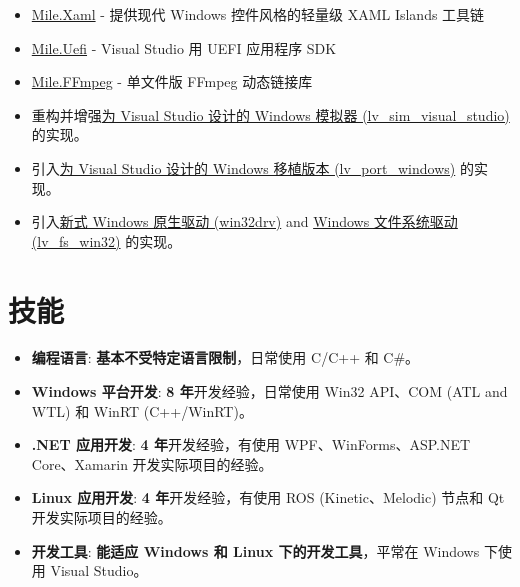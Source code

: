 \documentclass{resume}
\begin{document}
\begin{itemize}
  \item \href{https://github.com/ProjectMile/Mile.Xaml}{Mile.Xaml} - 提供现代 Windows 控件风格的轻量级 XAML Islands 工具链
  \item \href{https://github.com/ProjectMile/Mile.Uefi}{Mile.Uefi} - Visual Studio 用 UEFI 应用程序 SDK
  \item \href{https://github.com/ProjectMile/Mile.FFmpeg}{Mile.FFmpeg} - 单文件版 FFmpeg 动态链接库
\end{itemize} 

\begin{itemize}
  \item 重构并增强\href{https://github.com/lvgl/lv_sim_visual_studio}{为 Visual Studio 设计的 Windows 模拟器 (lv\_sim\_visual\_studio)} 的实现。
  \item 引入\href{https://github.com/lvgl/lv_port_windows}{为 Visual Studio 设计的 Windows 移植版本 (lv\_port\_windows)} 的实现。
  \item 引入\href{https://github.com/lvgl/lv_drivers/pull/117}{新式 Windows 原生驱动 (win32drv)} and \href{https://github.com/lvgl/lvgl/pull/2701}{Windows 文件系统驱动 (lv\_fs\_win32)} 的实现。
\end{itemize}

\section{技能}
\begin{itemize}

  \item \textbf{编程语言}:
    \textbf{基本不受特定语言限制}，日常使用 C/C++ 和 C\#。

  \item \textbf{Windows 平台开发}:
    \textbf{8 年}开发经验，日常使用 Win32 API、COM (ATL and WTL) 和 WinRT (C++/WinRT)。

  \item \textbf{.NET 应用开发}:
    \textbf{4 年}开发经验，有使用 WPF、WinForms、ASP.NET Core、Xamarin 开发实际项目的经验。
  
  \item \textbf{Linux 应用开发}:
    \textbf{4 年}开发经验，有使用 ROS (Kinetic、Melodic) 节点和 Qt 开发实际项目的经验。

  \item \textbf{开发工具}:
    \textbf{能适应 Windows 和 Linux 下的开发工具}，平常在 Windows 下使用 Visual Studio。

\end{itemize}
\end{document}
